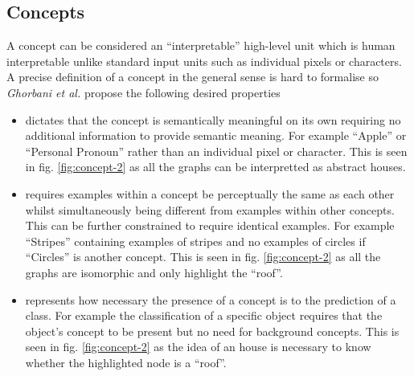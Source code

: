 \subsection{Concepts}



A concept can be considered an ``interpretable'' high-level unit which is human interpretable unlike standard input units such as individual pixels or characters.
A precise definition of a concept in the general sense is hard to formalise so \textit{Ghorbani et al.}\cite{ghorbani2019towards} propose the following desired properties
\begin{itemize}
    \item[]
        dictates that the concept is semantically meaningful on its own requiring no additional information to provide semantic meaning.
        For example ``Apple'' or ``Personal Pronoun'' rather than an individual pixel or character.
        This is seen in fig. \ref{fig:concept-2} as all the graphs can be interpretted as abstract houses.
    \item[]
        requires examples within a concept be perceptually the same as each other whilst simultaneously being different from examples within other concepts.
        This can be further constrained to require identical examples.
        For example ``Stripes'' containing examples of stripes and no examples of circles if ``Circles'' is another concept.
        This is seen in fig. \ref{fig:concept-2} as all the graphs are isomorphic and only highlight the ``roof''.
    \item[]
        represents how necessary the presence of a concept is to the prediction of a class.
        For example the classification of a specific object requires that the object's concept to be present but no need for background concepts.
        This is seen in fig. \ref{fig:concept-2} as the idea of an house is necessary to know whether the highlighted node is a ``roof''.
\end{itemize}


